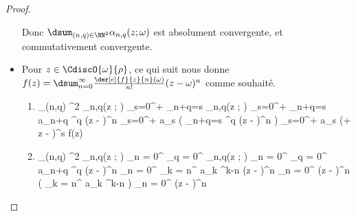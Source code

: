 \begin{proof}
\begin{itemize}
		\noindent
		Donc
		$\dsum_{(n,q) \in \NN^2} \alpha_{n,q}(z ; \omega)$
		est absolument convergente,
		et commutativement convergente.
	

		\item Pour $z \in \CdiscO{\omega}{\rho}$, ce qui suit nous donne
		$f(z) = \dsum_{n = 0}^{\infty} \frac{\der[e]{f}{z}{n}(\omega)}{n!} (z - \omega)^n$
		comme souhaité.

        \begin{multicols}{2}
        	\begin{enumerate}[wide]
    			\item
        		\begin{stepcalc}[style=ar*]
        			\dsum_{(n,q) \in \NN^2} \alpha_{n,q}(z ; \omega)
        		\explnext{}
        			\dsum_{s=0}^{+\infty} \dsum_{n+q=s} \alpha_{n,q}(z ; \omega)
        		\explnext{}
        			\dsum_{s=0}^{+\infty} \dsum_{n+q=s}  a_{n+q} \omega^q (z - \omega)^n
        		\explnext{}
        			\dsum_{s=0}^{+\infty} a_s \big( \dsum_{n+q=s}  \omega^q (z - \omega)^n \big)
        		\explnext{}
        			\dsum_{s=0}^{+\infty} a_s (\omega + z - \omega)^s
        		\explnext{}
        			f(z)
        		\end{stepcalc}


    			\item
        		\begin{stepcalc}[style=ar*]
        			\dsum_{(n,q) \in \NN^2} \alpha_{n,q}(z ; \omega)
        		\explnext{}
        			\dsum_{n = 0}^{\infty} \dsum_{q = 0}^{\infty} \alpha_{n,q}(z ; \omega)
        		\explnext{}
        			\dsum_{n = 0}^{\infty} \dsum_{q = 0}^{\infty}  a_{n+q} \omega^q (z - \omega)^n
        		\explnext{}
        			\dsum_{n = 0}^{\infty} \dsum_{k = n}^{\infty}  a_{k} \omega^{k-n} (z - \omega)^n
        		\explnext{}
        			\dsum_{n = 0}^{\infty}  (z - \omega)^n \big( \dsum_{k = n}^{\infty}  a_{k} \omega^{k-n} \big) 
        		\explnext{}
        			\dsum_{n = 0}^{\infty}  (z - \omega)^n
        		\end{stepcalc}
    		\end{enumerate}
	\end{multicols}
	\end{itemize}

	\null\vspace{-8ex}
\end{proof}




